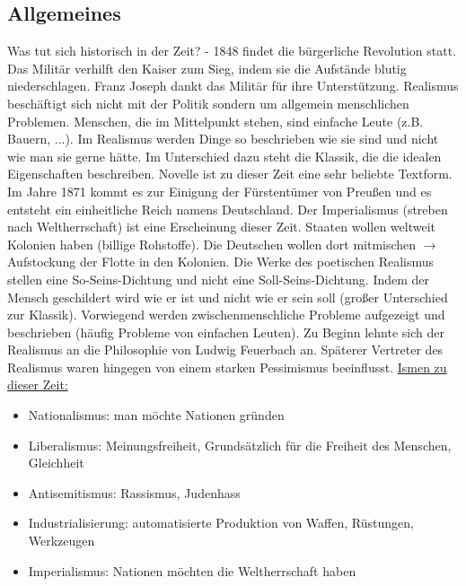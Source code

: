 \documentclass[12pt,a4paper]{article}
\begin{document}
\subsection{Allgemeines}
Was tut sich historisch in der Zeit? - 1848 findet die bürgerliche Revolution statt. Das Militär verhilft den Kaiser zum Sieg, indem sie die Aufstände blutig niederschlagen. Franz Joseph dankt das Militär für ihre Unterstützung.
\newline
\newline
Realismus beschäftigt sich nicht mit der Politik sondern um allgemein menschlichen Problemen. Menschen, die im Mittelpunkt stehen, sind einfache Leute (z.B. Bauern, ...). Im Realismus werden Dinge so beschrieben wie sie sind und nicht wie man sie gerne hätte. Im Unterschied dazu steht die Klassik, die die idealen Eigenschaften beschreiben. Novelle ist zu dieser Zeit eine sehr beliebte Textform.
\newline
\newline
Im Jahre 1871 kommt es zur Einigung der Fürstentümer von Preußen und es entsteht ein einheitliche Reich namens Deutschland. Der Imperialismus (streben nach Weltherrschaft) ist eine Erscheinung dieser Zeit. Staaten wollen weltweit Kolonien haben (billige Rohstoffe). Die Deutschen wollen dort mitmischen $\rightarrow$ Aufstockung der Flotte in den Kolonien.
\newline
\newline
Die Werke des poetischen Realismus stellen eine So-Seins-Dichtung und nicht eine Soll-Seins-Dichtung. Indem der Mensch geschildert wird wie er ist und nicht wie er sein soll (großer Unterschied zur Klassik). Vorwiegend werden zwischenmenschliche Probleme aufgezeigt und beschrieben (häufig Probleme von einfachen Leuten).
\newline
\newline
Zu Beginn lehnte sich der Realismus an die Philosophie von Ludwig Feuerbach an. Späterer Vertreter des Realismus waren hingegen von einem starken Pessimismus beeinflusst.
\newline
\newline
\underline{Ismen zu dieser Zeit:}
\begin{itemize}
\item Nationalismus: man möchte Nationen gründen
\item Liberalismus: Meinungsfreiheit, Grundsätzlich für die Freiheit des Menschen, Gleichheit
\item Antisemitismus: Rassismus, Judenhass
\item Industrialisierung: automatisierte Produktion von Waffen, Rüstungen, Werkzeugen
\item Imperialismus: Nationen möchten die Weltherrschaft haben
\end{itemize}
\end{document}
